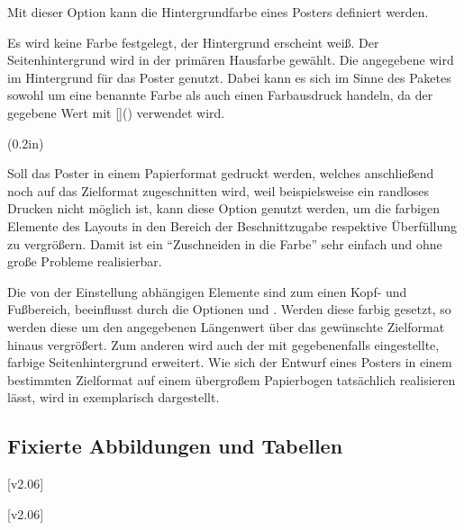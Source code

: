 \begin{DeclareEntity}{}
\begin{Declaration}
Mit dieser Option kann die Hintergrundfarbe eines Posters definiert werden.
\begin{DeclareValues}
  Es wird keine Farbe festgelegt, der Hintergrund erscheint weiß.
  Der Seitenhintergrund wird in der primären Hausfarbe  gewählt.
  Die angegebene  wird im Hintergrund für das Poster genutzt. 
  Dabei kann es sich im Sinne des Paketes  sowohl um eine 
  benannte Farbe als auch einen Farbausdruck handeln, da der gegebene Wert mit 
  []() verwendet wird.
\end{DeclareValues}
\end{Declaration}

\begin{Declaration}
  {}
  (0.2in)

Soll das Poster in einem Papierformat gedruckt werden, welches anschließend 
noch auf das Zielformat zugeschnitten wird, weil beispielsweise ein randloses 
Drucken nicht möglich ist, kann diese Option genutzt werden, um die farbigen 
Elemente des Layouts in den Bereich der Beschnittzugabe respektive Überfüllung 
zu vergrößern. Damit ist ein \enquote{Zuschneiden in die Farbe} sehr einfach 
und ohne große Probleme realisierbar.

Die von der Einstellung  abhängigen 
Elemente sind zum einen Kopf- und Fußbereich, beeinflusst durch die Optionen 
 und . Werden diese farbig gesetzt, so werden 
diese um den angegebenen Längenwert über das gewünschte Zielformat hinaus 
vergrößert. Zum anderen wird auch der mit  gegebenenfalls 
eingestellte, farbige Seitenhintergrund erweitert. Wie sich der Entwurf eines 
Posters in einem bestimmten Zielformat auf einem übergroßem Papierbogen 
tatsächlich realisieren lässt, wird in  exemplarisch 
dargestellt.
\end{Declaration}



\subsection{Fixierte Abbildungen und Tabellen}

\begin{Declaration}
  {}
  [v2.06]
\begin{Declaration}
  {}
  [v2.06]
\printdeclarationlist[Gleitobjekte]


\end{Declaration}
\end{Declaration}
\end{DeclareEntity}
